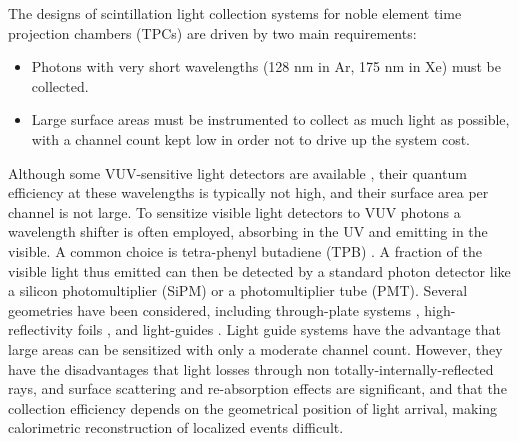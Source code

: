 


The designs of scintillation light collection systems for noble element time projection chambers (TPCs) are driven by two main requirements:

\begin{itemize}
\item Photons with very short wavelengths (128 nm in Ar, 175 nm in Xe) must be collected.
\item Large surface areas must be instrumented to collect as much light as possible, with a channel count kept low in order not to drive up the system cost.
\end{itemize}

Although some VUV-sensitive light detectors are available \cite{Zabrodskii2015348,DeepUV}, their quantum efficiency at these wavelengths is typically not high, and their surface area per channel is not large.  To sensitize visible light detectors to VUV photons a wavelength shifter is often employed, absorbing in the UV and emitting in the visible.  A common choice is tetra-phenyl butadiene (TPB) \cite{Baptista:2013gna,Hanagodimath2008,Gehman:2013lsx,Gehman:2011xm,Burton1973,Jones:2012hm,Francini:2013Jinst}.  A fraction of the visible light thus emitted can then be detected by a standard photon detector like a silicon photomultiplier (SiPM) or a photomultiplier tube (PMT).  Several geometries have been considered, including through-plate systems \cite{Briese:2013wua,PostdocRevisited}, high-reflectivity foils \cite{Szelc:2013ooa,Kryczynski:2015pmj}, and light-guides \cite{Baptista:2012bf,Moss:2014ota,Mufson:2013zba}.  Light guide systems have the advantage that large areas can be sensitized with only a moderate channel count.  However, they have the disadvantages that light losses through non totally-internally-reflected rays, and surface scattering and re-absorption effects \cite{Jones:2013sfa} are significant, and that the collection efficiency depends on the geometrical position of light arrival, making calorimetric reconstruction of localized events difficult.

